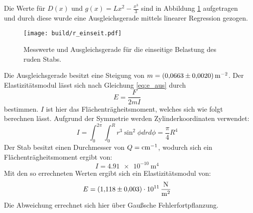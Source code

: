 \noindent Die Werte für $D(x)$ und $g(x)=Lx^2-\frac{x^3}{3}$ sind in Abbildung \ref{fig:plot1} 
aufgetragen und durch diese wurde eine Ausgleichsgerade mittels linearer Regression gezogen.
\begin{figure}
    \centering
    \texttt{[image: build/r\_einseit.pdf]}
    \caption{Messwerte und Ausgleichsgerade für die einseitige Belastung des ruden Stabs.}
    \label{fig:plot1}
\end{figure}
%
\noindent Die Ausgleichsgerade besitzt eine Steigung von $m=\SI[per-mode=reciprocal]{0.0663\pm 
0.002}{\per\meter\squared}$.
Der Elastizitätsmodul lässt sich nach Gleichung \eqref{eq:e_aus} durch
\begin{equation}
  E=\frac{F}{2mI}
\end{equation}
bestimmen.
$I$ ist hier das Flächenträgheitsmoment, welches sich wie folgt berechnen lässt.
Aufgrund der Symmetrie werden Zylinderkoordinaten verwendet:
\begin{equation}
  I=\int_0^{2\pi} \int_0^R r^3 \sin^2{\phi} dr d\phi=\frac{\pi}{4}R^4
\end{equation}
Der Stab besitzt einen Durchmesser von $Q=\si[per-mode=reciprocal]{\per\centi\meter}$, wodurch 
sich ein Flächenträgheitsmoment ergibt von:
\begin{equation*}
  I=\SI{4.91e-10}{\meter\tothe{4}}
\end{equation*}
Mit den so errechneten Werten ergibt sich ein Elastizitätsmodul von:
\begin{equation*}
  E=\SI{1.118\pm0.003e11}{\newton\per\meter\squared}
\end{equation*}
Die Abweichung errechnet sich hier über Gaußsche Fehlerfortpflanzung.
%
